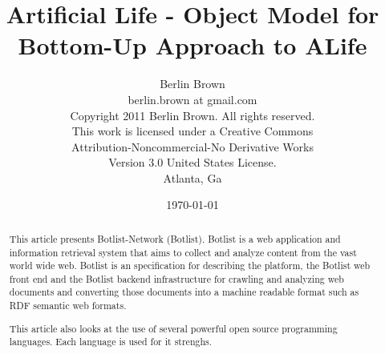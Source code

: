 \documentclass[9pt]{article}
\begin{document}
\title{Artificial Life - Object Model for Bottom-Up Approach to ALife}

\author{Berlin Brown\\
  berlin.brown at gmail.com\\
  Copyright 2011 Berlin Brown.  All rights reserved.\\ 
  This work is licensed under a Creative Commons\\
  Attribution-Noncommercial-No Derivative Works\\
  Version 3.0 United States License. \\
  Atlanta, Ga\\
  \date{\today}}

\maketitle

\tableofcontents

\begin{abstract}
This article presents Botlist-Network (Botlist).  Botlist is a 
web application and information retrieval system that aims to collect
and analyze content from the vast world wide web.  Botlist is an specification
for describing the platform, the Botlist web front end and the Botlist backend
infrastructure for crawling and analyzing web documents and converting those
documents into a machine readable format such as RDF semantic web formats.

This article also looks at the use of several powerful open source programming
languages.  Each language is used for it strenghs.
\end{abstract}

\end{document}
